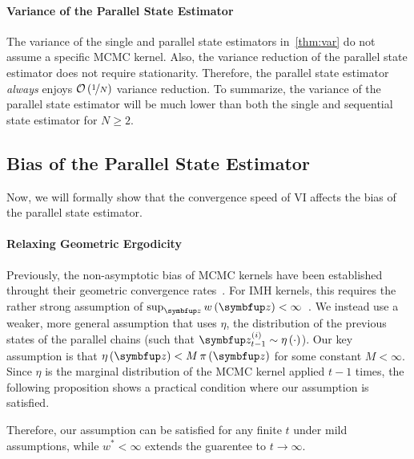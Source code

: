 \paragraph{Variance of the Parallel State Estimator}
The variance of the single and parallel state estimators in~\cref{thm:var} do not assume a specific MCMC kernel.
Also, the variance reduction of the parallel state estimator does not require stationarity.
Therefore, the parallel state estimator \textit{always} enjoys \(\mathcal{O}\left(\nicefrac{1}{N}\right)\) variance reduction.
To summarize, the variance of the parallel state estimator will be much lower than both the single and sequential state estimator for \(N \geq 2\).

\vspace{-0.05in}
\subsection{Bias of the Parallel State Estimator}\label{section:bias}
\vspace{-0.05in}
Now, we will formally show that the convergence speed of VI affects the bias of the parallel state estimator.

\vspace{-0.05in}
\paragraph{Relaxing Geometric Ergodicity}
Previously, the non-asymptotic bias of MCMC kernels have been established throught their geometric convergence rates~\citep{jiang_mcmc_2021}.
For IMH kernels, this requires the rather strong assumption of \(\sup_{\vz} w\left(\vz\right) < \infty\)~\citep{10.2307/2242610, wang_exact_2020}.
We instead use a weaker, more general assumption that uses \(\eta\), the distribution of the previous states of the parallel chains (such that \(\vz^{(i)}_{t-1} \sim \eta\left(\cdot\right)\)).
Our key assumption is that \(\eta\left(\vz\right) < M\,\pi\left(\vz\right)\) for some constant \(M < \infty\).
Since \(\eta\) is the marginal distribution of the MCMC kernel applied \(t-1\) times, the following proposition shows a practical condition where our assumption is satisfied.



Therefore, our assumption can be satisfied for any finite \(t\) under mild assumptions, while \(w^* < \infty\) extends the guarentee to \(t \rightarrow \infty\).

\vspace{-0.05in}
